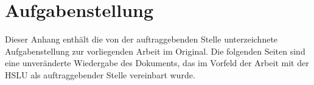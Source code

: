 \chapter{Aufgabenstellung}
\label{app:aufgabenstellung}

Dieser Anhang enthält die von der auftraggebenden Stelle unterzeichnete Aufgabenstellung zur vorliegenden Arbeit im Original.
Die folgenden Seiten sind eine unveränderte Wiedergabe des Dokuments, das im Vorfeld der Arbeit mit der HSLU als auftraggebender Stelle vereinbart wurde.


